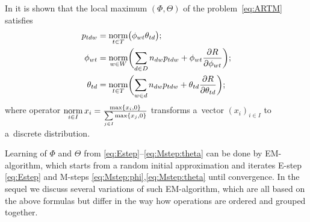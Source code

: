 \documentclass[russian,english]{llncs}
\newcommand{\norm}{\mathop{\rm norm}\limits}
\begin{document}
In \cite{voron14dan-eng} it is shown that the \mbox{local} maximum $(\Phi,\Theta)$
of the problem~\eqref{eq:ARTM} satisfies
\begin{align}
    \label{eq:Estep}
    p_{tdw} &= \norm_{t\in T} \bigl(\phi_{wt}\theta_{td}\bigr);
\\
    \label{eq:Mstep:phi}
    \phi_{wt} &= \norm_{w\in W}
        \biggl(
            \sum_{d\in D} n_{dw} p_{tdw} + \phi_{wt} \frac{\partial R}{\partial \phi_{wt}}
        \biggr);
\\
    \label{eq:Mstep:theta}
    \theta_{td} &= \norm_{t\in T}
        \biggl(
            \sum_{w\in d} n_{dw} p_{tdw} + \theta_{td} \frac{\partial R}{\partial \theta_{td}}
        \biggr);
\end{align}
where operator
$\norm_{i \in I} x_i = \frac{\max\{x_i,0\}}{\sum\limits_{j\in I} \max\{x_j,0\}}$
transforms a~vector $(x_i)_{i \in I}$ to a~discrete distribution.

Learning of $\Phi$ and $\Theta$ from \eqref{eq:Estep}--\eqref{eq:Mstep:theta} can be done by EM-algorithm,
which starts from a random initial approximation and iterates
E-step \eqref{eq:Estep} and
M-steps \eqref{eq:Mstep:phi},\eqref{eq:Mstep:theta}
until convergence.
In the sequel we discuss several variations of such EM-algorithm,
which are all based on the above formulas but differ in the way how operations are ordered and grouped together.

\end{document}
